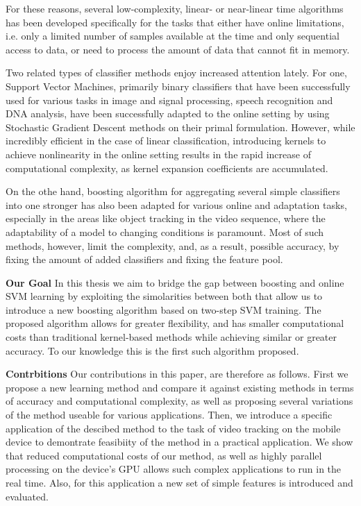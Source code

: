 For these reasons, several low-complexity, linear- or near-linear time algorithms has been developed specifically for the tasks that either have online limitations, i.e. only a limited number of samples available at the time and only sequential access to data, or need to process the amount of data that cannot fit in memory.

Two related types of classifier methods enjoy increased attention lately. For one, Support Vector Machines, primarily binary classifiers that have been successfully used for various tasks in image and signal processing, speech recognition and DNA analysis, have been successfully adapted to the online setting by using Stochastic Gradient Descent methods on their primal formulation. However, while incredibly efficient in the case of linear classification, introducing kernels to achieve nonlinearity in the online setting results in the  rapid increase of computational complexity, as kernel expansion coefficients are accumulated. 

On the othe hand, boosting algorithm for aggregating several simple classifiers into one stronger has also been adapted for various online and adaptation tasks, especially in the areas like object tracking in the video sequence, where the adaptability of a model to changing conditions is paramount. Most of such methods, however, limit the complexity, and, as a result, possible accuracy, by fixing the amount of added classifiers and fixing the feature pool. 

{\bf Our Goal} In this thesis we aim to bridge the gap between boosting and online SVM learning by exploiting the simolarities between both that allow us to introduce a new boosting algorithm based on two-step SVM training. The proposed algorithm allows for greater flexibility, and has smaller computational costs than traditional kernel-based methods while achieving similar or greater accuracy. To our knowledge this is the first such algorithm proposed. 

{\bf Contrbitions} Our contributions in this paper, are therefore as follows. First we propose a new learning method and compare it against existing methods in terms of accuracy and computational complexity, as well as proposing several variations of the method useable for various applications. Then, we introduce a specific application of the descibed method to the task of video tracking on the mobile device to demontrate feasibiity of the method in a practical application. We show that reduced computational costs of our method, as well as highly parallel processing on the device's GPU allows such complex applications to run in the real time. Also, for this application a new set of simple features is introduced and evaluated.

